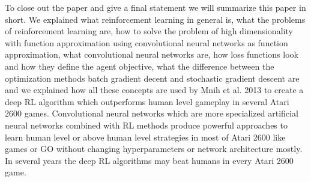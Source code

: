 \documentclass[conference]{IEEEtran}
\begin{document}
To close out the paper and give a final statement we will summarize this paper in short. We explained what reinforcement learning in general is, what the problems of reinforcement learning are, how to solve the problem of high dimensionality with function approximation using convolutional neural networks as function approximation, what convolutional neural networks are, how loss functions look and how they define the agent objective, what the difference between the optimization methods batch gradient decent and stochastic gradient descent are and we explained how all these concepts are used by Mnih et al. 2013 \cite{mnih-atari-2013} to create a deep RL algorithm which outperforms human level gameplay in several Atari 2600 games. Convolutional neural networks which are more specialized artificial neural networks combined with RL methods produce powerful approaches to learn human level or above human level strategies in most of Atari 2600 like games or GO without changing hyperparameters or network architecture mostly. In several years the deep RL algorithms may beat humans in every Atari 2600 game. 












%

\end{document}
